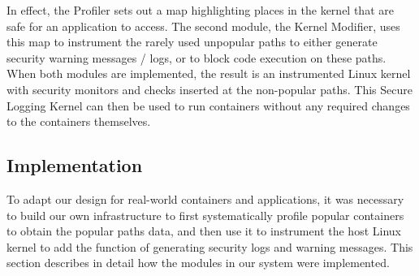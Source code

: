 In effect, the Profiler sets out a map highlighting places in the kernel that are safe for an application to access. 
The second module, the Kernel Modifier,  uses this map to instrument the rarely used unpopular paths to either generate security warning messages / logs, or to block code execution on these paths. 
When both modules are implemented, the result is an instrumented Linux kernel with security monitors and checks inserted at the non-popular paths. 
This Secure Logging Kernel can then be used to run containers without any required changes to the containers themselves.

\subsection{Implementation}
\label{sec.design.implementation}
To adapt our design for real-world containers and applications, it was necessary to build our own infrastructure to first systematically profile popular containers to obtain the popular paths data, and then use it to instrument the host Linux kernel to add the function of generating security logs and warning messages.  
This section describes in detail how the modules in our system were implemented.

